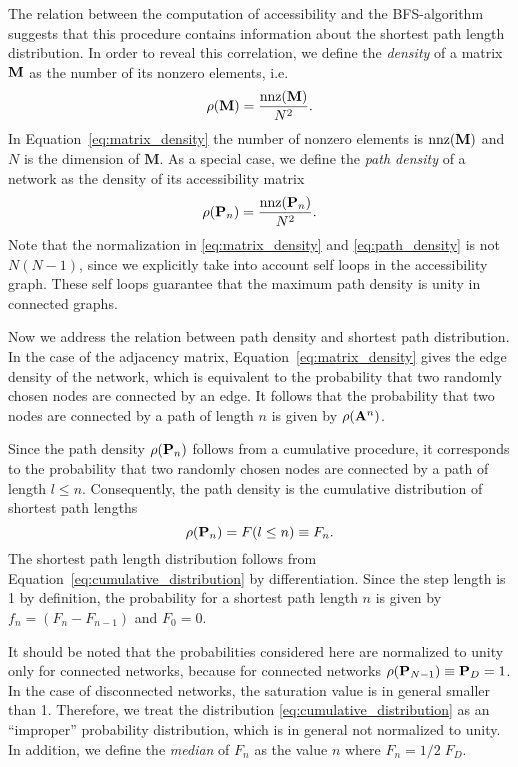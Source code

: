 The relation between the computation of accessibility and the BFS-algorithm suggests that this procedure contains information about the shortest path length distribution.
In order to reveal this correlation, we define the \emph{density} of a matrix $\mathbf{M}$ as the number of its nonzero elements, i.e.
\begin{equation}\label{eq:matrix_density}
\rho (\mathbf{M}) =\frac{\mathrm{nnz}(\mathbf{M})}{N^2}.
\end{equation}
In Equation~\eqref{eq:matrix_density} the number of nonzero elements is $\mathrm{nnz}(\mathbf{M})$ and $N$ is the dimension of $\mathbf{M}$.
As a special case, we define the \emph{path density} of a  network as the density of its accessibility matrix
\begin{equation}\label{eq:path_density}
\rho (\mathbf{P}_n) =\frac{\mathrm{nnz}(\mathbf{P}_n)}{N^2}.
\end{equation}
Note that the normalization in \eqref{eq:matrix_density} and \eqref{eq:path_density} is not $N(N-1)$, since we explicitly take into account self loops in the accessibility graph.
These self loops guarantee that the maximum path density is unity in connected graphs.

Now we address the relation between path density and shortest path distribution.
In the case of the adjacency matrix, Equation~\eqref{eq:matrix_density} gives the edge density of the network, which is equivalent to the probability that two randomly chosen nodes are connected by an edge.
It follows that the probability that two nodes are connected by a path of length $n$ is given by $\rho (\mathbf{A}^n)$.

Since the path density $\rho (\mathbf{P}_n)$ follows from a cumulative procedure, it corresponds to the probability that two randomly chosen nodes are connected by a path of length $l\leq n$.
Consequently, the path density is the cumulative distribution of shortest path lengths
\begin{equation}\label{eq:cumulative_distribution}
\rho (\mathbf{P}_n)=F(l\leq n)\equiv F_n .
\end{equation}
The shortest path length distribution follows from Equation~\eqref{eq:cumulative_distribution} by differentiation.
Since the step length is 1 by definition, the probability for a shortest path length $n$ is given by $f_n=(F_n-F_{n-1})$ and $F_0=0$.

It should be noted that the probabilities considered here are normalized to unity only for connected networks, because for connected networks $\rho (\mathbf{P}_{N-1})\equiv \mathbf{P}_D=1$.
In the case of disconnected networks, the saturation value is in general smaller than 1.
Therefore,  we treat the distribution \eqref{eq:cumulative_distribution} as an ``improper'' probability distribution, which is in general not normalized to unity.
In addition, we define the \emph{median} of $F_n$ as the value $n$ where $F_n=1/2 \; F_D$.

